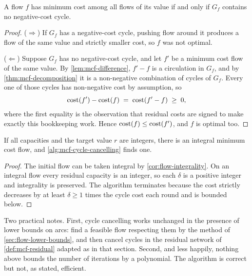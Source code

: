 \begin{theorem}\label{thm:mcf-optimality}
A flow $f$ has minimum cost among all flows of its value if and only if $G_f$
contains no negative-cost cycle.
\end{theorem}

\begin{proof}
($\Rightarrow$) If $G_f$ has a negative-cost cycle, pushing flow around it
produces a flow of the same value and strictly smaller cost, so $f$ was not
optimal.

($\Leftarrow$) Suppose $G_f$ has no negative-cost cycle, and let $f'$ be a
minimum cost flow of the same value. By \cref{lem:mcf-difference}, $f'-f$ is a
circulation in $G_f$, and by \cref{thm:mcf-decomposition} it is a non-negative
combination of cycles of $G_f$. Every one of those cycles has non-negative
cost by assumption, so
\[ \operatorname{cost}(f') - \operatorname{cost}(f) \;=\; \operatorname{cost}(f'-f) \;\ge\; 0, \]
where the first equality is the observation that residual costs are signed to
make exactly this bookkeeping work. Hence $\operatorname{cost}(f) \le \operatorname{cost}(f')$, and $f$ is
optimal too.
\end{proof}

\begin{corollary}[Integrality]\label{cor:mcf-integrality}
If all capacities and the target value $r$ are integers, there is an integral
minimum cost flow, and \cref{alg:mcf-cycle-cancelling} finds one.
\end{corollary}

\begin{proof}
The initial flow can be taken integral by \cref{cor:flow-integrality}. On an
integral flow every residual capacity is an integer, so each $\delta$ is a
positive integer and integrality is preserved. The algorithm terminates because
the cost strictly decreases by at least $\delta \ge 1$ times the cycle cost each
round and is bounded below.
\end{proof}

\begin{remark}
Two practical notes. First, cycle cancelling works unchanged in the presence of
lower bounds on arcs: find a feasible flow respecting them by the method of
\cref{sec:flow-lower-bounds}, and then cancel cycles in the residual network of
\cref{def:mcf-residual} adapted as in that section. Second, and less happily,
nothing above bounds the number of iterations by a polynomial. The algorithm
is correct but not, as stated, efficient.
\end{remark}

